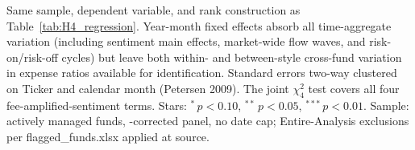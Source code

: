 \begin{table}[!htbp]
\begin{minipage}{\tabletempwidth}
\par\medskip
\begin{singlespace}\tablefont\noindent
Same sample, dependent variable, and rank construction as Table~\ref{tab:H4_regression}. Year-month fixed effects absorb all time-aggregate variation (including sentiment main effects, market-wide flow waves, and risk-on/risk-off cycles) but leave both within- and between-style cross-fund variation in expense ratios available for identification. Standard errors two-way clustered on Ticker and calendar month (Petersen 2009). The joint $\chi^2_4$ test covers all four fee-amplified-sentiment terms. Stars: $^{*}\,p<0.10$, $^{**}\,p<0.05$, $^{***}\,p<0.01$. Sample: actively managed funds, \textcite{Evans2010}-corrected panel, no date cap; Entire-Analysis exclusions per flagged\_funds.xlsx applied at source.
\end{singlespace}
\end{minipage}
\end{table}

